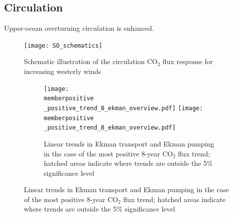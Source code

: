 \documentclass[aspectratio=169]{beamer}
\newcommand{\memberpositive}{m178_1985_1992} %
\begin{document}
\subsection{Circulation}
\begin{frame}{Upper-ocean overturning circulation is enhanced.}

	\begin{minipage}{.3\textwidth}
		
		\begin{figure}[h!]
			\centering
			\texttt{[image: SO\_schematics]}
			\caption{Schematic illustration of the circulation CO$_2$ flux response for increasing westerly winds}
			\label{fig:schematics_neg}
		\end{figure}		
	
		
	\end{minipage} \hfill
	\begin{minipage}{.66\textwidth}
		\begin{figure}[h!]
		\begin{figure}[h!]
	\centering
	\texttt{[image: \\memberpositive \_positive\_trend\_8\_ekman\_overview.pdf]}
	\texttt{[image: \\memberpositive \_positive\_trend\_8\_ekman\_overview.pdf]}
	\caption{Linear trends in Ekman transport and Ekman pumping in the case of the most positive 8-year CO$_2$ flux trend; hatched areas indicate where trends are outside the 5\% significance level}
	\label{fig:UOOC_pos}
\end{figure}
		\end{figure}
	\end{minipage}

\end{frame}
\end{document}
